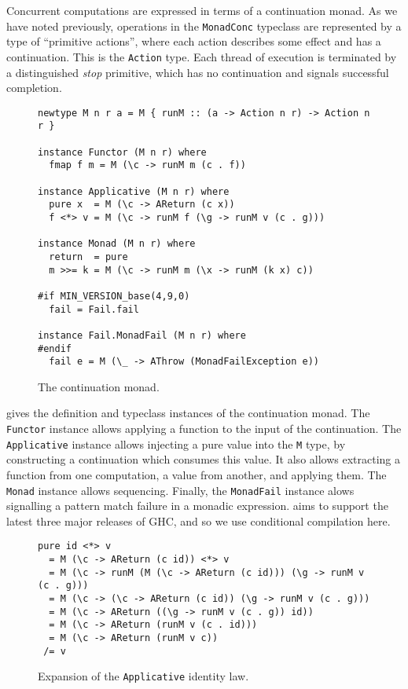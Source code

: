 Concurrent computations are expressed in terms of a continuation monad.  As we
have noted previously, operations in the \verb|MonadConc| typeclass are
represented by a type of ``primitive actions'', where each action describes some
effect and has a continuation.  This is the \verb|Action| type.  Each thread of
execution is terminated by a distinguished \emph{stop} primitive, which has no
continuation and signals successful completion.

\begin{figure}[t]
  \centering
  \begin{lstlisting}
newtype M n r a = M { runM :: (a -> Action n r) -> Action n r }

instance Functor (M n r) where
  fmap f m = M (\c -> runM m (c . f))

instance Applicative (M n r) where
  pure x  = M (\c -> AReturn (c x))
  f <*> v = M (\c -> runM f (\g -> runM v (c . g)))

instance Monad (M n r) where
  return  = pure
  m >>= k = M (\c -> runM m (\x -> runM (k x) c))

#if MIN_VERSION_base(4,9,0)
  fail = Fail.fail

instance Fail.MonadFail (M n r) where
#endif
  fail e = M (\_ -> AThrow (MonadFailException e))
  \end{lstlisting}
  \caption{The \dejafu{} continuation monad.}
  \label{fig:m}
\end{figure}

 gives the definition and typeclass instances of the \dejafu{}
continuation monad.  The \verb|Functor| instance allows applying a function to
the input of the continuation.  The \verb|Applicative| instance allows injecting
a pure value into the \verb|M| type, by constructing a continuation which
consumes this value.  It also allows extracting a function from one computation,
a value from another, and applying them.  The \verb|Monad| instance allows
sequencing.  Finally, the \verb|MonadFail| instance alows signalling a pattern
match failure in a monadic expression.  \dejafu{} aims to support the latest
three major releases of GHC, and so we use conditional compilation here.

\begin{figure}[t]
  \centering
\begin{lstlisting}
pure id <*> v
  = M (\c -> AReturn (c id)) <*> v
  = M (\c -> runM (M (\c -> AReturn (c id))) (\g -> runM v (c . g)))
  = M (\c -> (\c -> AReturn (c id)) (\g -> runM v (c . g)))
  = M (\c -> AReturn ((\g -> runM v (c . g)) id))
  = M (\c -> AReturn (runM v (c . id)))
  = M (\c -> AReturn (runM v c))
 /= v
\end{lstlisting}
  \caption{Expansion of the \texttt{Applicative} identity law.}
  \label{fig:areturn}
\end{figure}

